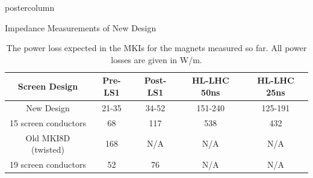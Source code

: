 \documentclass[final,hyperref={pdfpagelabels=false}]{beamer}
\begin{document}
\begin{frame}
\begin{columns}
\begin{column}{.49\textwidth}
\begin{beamercolorbox}[center,wd=\textwidth]{postercolumn}
\begin{minipage}[T]{.95\textwidth}
{\begin{block}{Impedance Measurements of New Design}
\begin{table}
\label{tab:heating-mki-screen-designs}
\caption{\small{The power loss expected  in the MKIs for the magnets measured so far. All power losses are given in W/m.}}
\begin{center}
\begin{tabular}{c | c | c | c | c}
\small{Screen Design} & \small{Pre-LS1} & \small{Post-LS1} & \small{HL-LHC 50ns} & \small{HL-LHC 25ns} \\ \hline 
\small{New Design} & 21-35 & 34-52 & 151-240 & 125-191 \\ \hline
\small{15 screen conductors} & 68 & 117 & 538 & 432 \\ \hline
\small{Old MKI8D (twisted)} & 168 & N/A & N/A & N/A \\ \hline
\small{19 screen conductors} & 52 & 76 & N/A & N/A \\
\end{tabular}
\end{center}
\end{table}


\end{block}}
\end{minipage}
\end{beamercolorbox}
\end{column}
\end{columns}
\end{frame}
\end{document}

